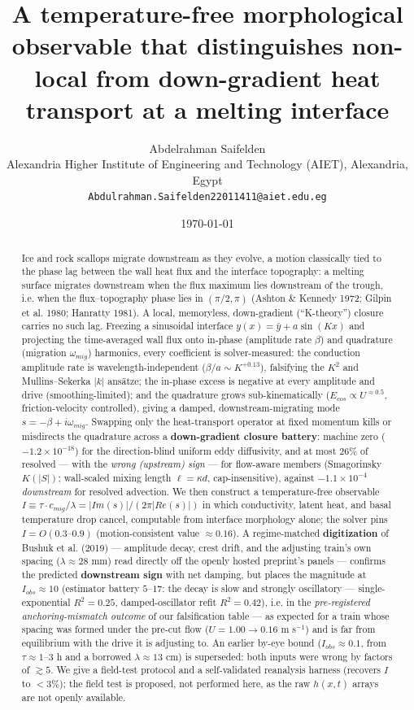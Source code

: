 \documentclass[11pt]{article}
\title{A temperature-free morphological observable that distinguishes non-local from down-gradient heat transport at a melting interface}
\author{Abdelrahman Saifelden\\ Alexandria Higher Institute of Engineering and Technology (AIET), Alexandria, Egypt\\ \texttt{Abdulrahman.Saifelden22011411@aiet.edu.eg}}
\date{\today}
\begin{document}
\maketitle

\begin{abstract}


Ice and rock scallops migrate downstream as they evolve, a motion classically tied to the phase lag between the wall heat flux and the interface topography: a melting surface migrates downstream when the flux maximum lies downstream of the trough, i.e. when the flux–topography phase lies in $(\pi /2, \pi )$ (Ashton \& Kennedy 1972; Gilpin et al. 1980; Hanratty 1981). A local, memoryless, down-gradient (``K-theory'') closure carries no such lag. Freezing a sinusoidal interface $y(x)=\bar{y}+a \sin(Kx)$ and projecting the time-averaged wall flux onto in-phase (amplitude rate $\beta $) and quadrature (migration $\omega _{mig}$) harmonics, every coefficient is solver-measured: the conduction amplitude rate is wavelength-independent ($\beta /a \sim  K^{+0.13}$), falsifying the $K^{2}$ and Mullins–Sekerka $|k|$ ansätze; the in-phase excess is negative at every amplitude and drive (smoothing-limited); and the quadrature grows sub-kinematically ($E_{cos} \propto  U^{\approx 0.5}$, friction-velocity controlled), giving a damped, downstream-migrating mode $s = -\beta  + i\omega _{mig}$. Swapping only the heat-transport operator at fixed momentum kills or misdirects the quadrature across a \textbf{down-gradient closure battery}: machine zero ($-1.2\times 10^{-18}$) for the direction-blind uniform eddy diffusivity, and at most $26\%$ of resolved — with the \emph{wrong (upstream) sign} — for flow-aware members (Smagorinsky $K(|S|)$; wall-scaled mixing length $\ell =\kappa d$, cap-insensitive), against $-1.1\times 10^{-4}$ \emph{downstream} for resolved advection. We then construct a temperature-free observable $I \equiv  \tau \cdot c_{mig}/\lambda  = |Im(s)|/(2\pi |Re(s)|)$ in which conductivity, latent heat, and basal temperature drop cancel, computable from interface morphology alone; the solver pins $I = O(0.3–0.9)$ (motion-consistent value $\approx 0.16$). A regime-matched \textbf{digitization} of Bushuk et al. (2019) — amplitude decay, crest drift, and the adjusting train's own spacing ($\lambda \approx 28$ mm) read directly off the openly hosted preprint's panels — confirms the predicted \textbf{downstream sign} with net damping, but places the magnitude at $I_{obs}\approx 10$ (estimator battery $5$–$17$: the decay is slow and strongly oscillatory — single-exponential $R^{2}=0.25$, damped-oscillator refit $R^{2}=0.42$), i.e. in the \emph{pre-registered anchoring-mismatch outcome} of our falsification table — as expected for a train whose spacing was formed under the pre-cut flow ($U=1.00\to 0.16$ m s$^{-1}$) and is far from equilibrium with the drive it is adjusting to. An earlier by-eye bound ($I_{obs}\approx 0.1$, from $\tau \approx 1–3$ h and a borrowed $\lambda \approx 13$ cm) is superseded: both inputs were wrong by factors of $\gtrsim 5$. We give a field-test protocol and a self-validated reanalysis harness (recovers $I$ to $<3\%$); the field test is proposed, not performed here, as the raw $h(x,t)$ arrays are not openly available.



\end{abstract}
\end{document}
